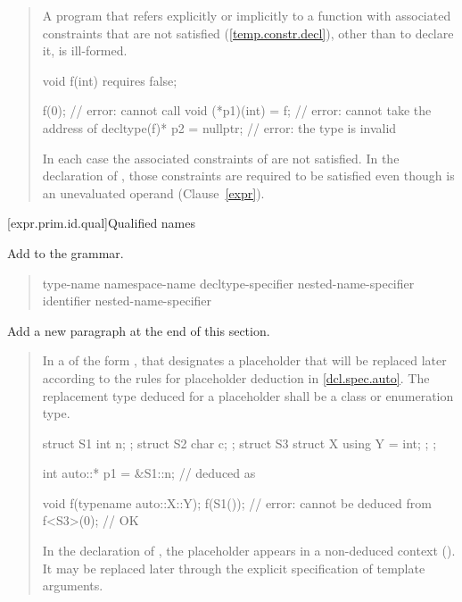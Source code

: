 \begin{quote}
\begin{addedblock}
\pnum
A program that refers explicitly or implicitly to a function with associated 
constraints that are not satisfied (\ref{temp.constr.decl}), other than to 
declare it, is ill-formed.
% 
\enterexample
\begin{codeblock}
void f(int) requires false;

f(0);                      // error: cannot call 
void (*p1)(int) = f;       // error: cannot take the address of 
decltype(f)* p2 = nullptr; // error: the type  is invalid
\end{codeblock}
In each case the associated constraints of  are not satisfied. In the 
declaration of , those constraints are required to be satisfied even 
though  is an unevaluated operand (Clause~\ref{expr}).
\exitexample
\end{addedblock}
\end{quote}


\setcounter{subsubsection}{1}
[expr.prim.id.qual]{Qualified names}

Add  to the  grammar.

\begin{quote}
\begin{bnf}
\br
    \terminal{::}\br
    type-name \terminal{::}\br
    namespace-name \terminal{::}\br
    decltype-specifier \terminal{::}\br
    \br
    nested-name-specifier identifier \terminal{::}\br
    nested-name-specifier \opt \terminal{::}
\end{bnf}
\end{quote}

Add a new paragraph at the end of this section.

\begin{quote}
\begin{addedblock}
\setcounter{Paras}{5}
\pnum
In a  of the form ,
that  designates a placeholder that 
will be replaced later according to the rules for placeholder deduction in
\ref{dcl.spec.auto}.
%
The replacement type deduced for a placeholder shall be a class or
enumeration type.
% 
\enterexample
\begin{codeblock}
struct S1 { int n; };
struct S2 { char c; };
struct S3 { struct X { using Y = int; }; };

int auto::* p1 = &S1::n; //  deduced as 

void f(typename auto::X::Y);
f(S1()); // error:  cannot be deduced from 
f<S3>(0); // OK
\end{codeblock}
In the declaration of , the placeholder appears in a non-deduced 
context (). It may be replaced later through the
explicit specification of template arguments.
\exitexample
\end{addedblock}
\end{quote}


